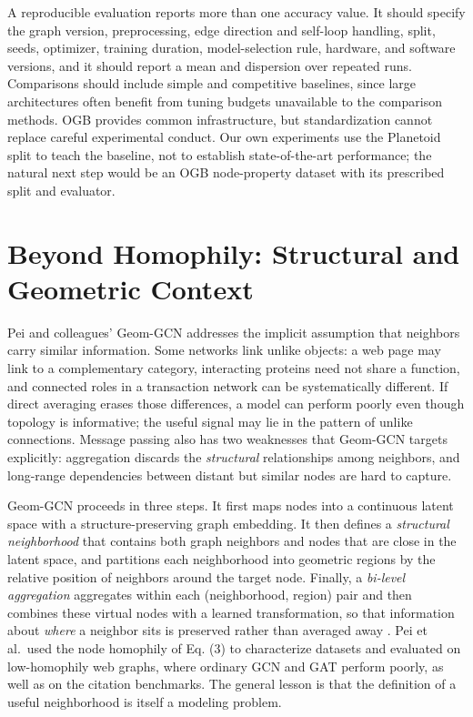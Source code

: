 \documentclass[conference]{IEEEtran}
\begin{document}
A reproducible evaluation reports more than one accuracy value. It should specify the graph version, preprocessing, edge direction and self-loop handling, split, seeds, optimizer, training duration, model-selection rule, hardware, and software versions, and it should report a mean and dispersion over repeated runs. Comparisons should include simple and competitive baselines, since large architectures often benefit from tuning budgets unavailable to the comparison methods. OGB provides common infrastructure, but standardization cannot replace careful experimental conduct. Our own experiments use the Planetoid split to teach the baseline, not to establish state-of-the-art performance; the natural next step would be an OGB node-property dataset with its prescribed split and evaluator.

\section{Beyond Homophily: Structural and Geometric Context}

Pei and colleagues' Geom-GCN \cite{b10} addresses the implicit assumption that neighbors carry similar information. Some networks link unlike objects: a web page may link to a complementary category, interacting proteins need not share a function, and connected roles in a transaction network can be systematically different. If direct averaging erases those differences, a model can perform poorly even though topology is informative; the useful signal may lie in the pattern of unlike connections. Message passing also has two weaknesses that Geom-GCN targets explicitly: aggregation discards the \emph{structural} relationships among neighbors, and long-range dependencies between distant but similar nodes are hard to capture.

Geom-GCN proceeds in three steps. It first maps nodes into a continuous latent space with a structure-preserving graph embedding. It then defines a \emph{structural neighborhood} that contains both graph neighbors and nodes that are close in the latent space, and partitions each neighborhood into geometric regions by the relative position of neighbors around the target node. Finally, a \emph{bi-level aggregation} aggregates within each (neighborhood, region) pair and then combines these virtual nodes with a learned transformation, so that information about \emph{where} a neighbor sits is preserved rather than averaged away \cite{b10}. Pei et al.~used the node homophily of Eq. (3) to characterize datasets and evaluated on low-homophily web graphs, where ordinary GCN and GAT perform poorly, as well as on the citation benchmarks. The general lesson is that the definition of a useful neighborhood is itself a modeling problem.
\end{document}
